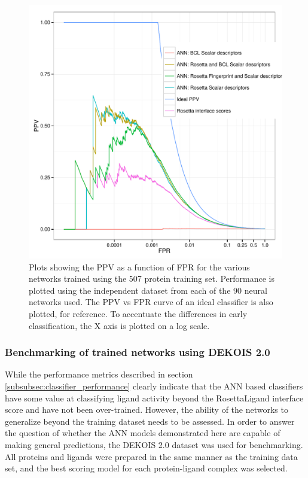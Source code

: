 \begin{figure}
\centering
\includegraphics[width=6in]{figures/hts/ppv_plot.pdf}
\caption{
Plots showing the \acs{PPV} as a function of \acs{FPR} for the various networks trained using the 507 protein training set.
Performance is plotted using the independent dataset from each of the 90 neural networks used.
The \acs{PPV} vs \acs{FPR} curve of an ideal classifier is also plotted, for reference.
To accentuate the differences in early classification, the X axis is plotted on a log scale.
}
\label{fig:ppv_plot}
\end{figure}

\subsubsection{Benchmarking of trained networks using DEKOIS 2.0}
While the performance metrics described in section \ref{subsubsec:classifier_performance} clearly indicate that the \ac{ANN} based classifiers have some value at classifying ligand activity beyond the RosettaLigand interface score and have not been over-trained.
However, the ability of the networks to generalize beyond the training dataset needs to be assessed.
In order to answer the question of whether the \ac{ANN} models demonstrated here are capable of making general predictions, the DEKOIS 2.0 \citep{Bauer:2013de} dataset was used for benchmarking. 
All proteins and ligands were prepared in the same manner as the training data set, and the best scoring model for each protein-ligand complex was selected.

